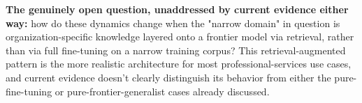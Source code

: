 \textbf{The genuinely open question, unaddressed by current evidence either way:} how do these dynamics change when the "narrow domain" in question is organization-specific knowledge layered onto a frontier model via retrieval, rather than via full fine-tuning on a narrow training corpus? This retrieval-augmented pattern is the more realistic architecture for most professional-services use cases, and current evidence doesn't clearly distinguish its behavior from either the pure-fine-tuning or pure-frontier-generalist cases already discussed.
